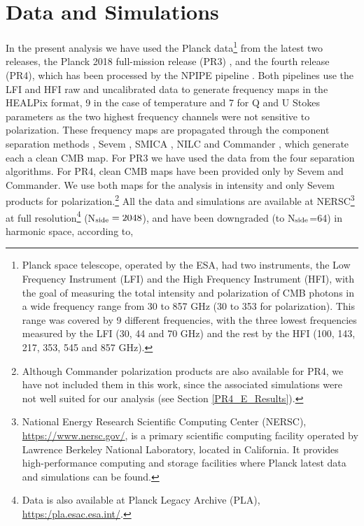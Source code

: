 \section{Data and Simulations}\label{DatSim}

In the present analysis we have used the Planck data\footnote{Planck space telescope, operated by the ESA, had two instruments, the Low Frequency Instrument (LFI) and the High Frequency Instrument (HFI), with the goal of measuring the total intensity and polarization of CMB photons in a wide frequency range from 30 to 857 GHz (30 to 353 for polarization). This range was 
covered by 9 different frequencies, with the three lowest frequencies measured by the LFI (30, 44 and 70 GHz) and the rest by the HFI (100, 143, 217, 353, 545 and 857 GHz).} from the latest two releases, the Planck 2018 full-mission release (PR3) \cite{Planck:2018nkj}, and the fourth release (PR4), which has been processed by the NPIPE pipeline \cite{Planck:2020olo}. Both pipelines use the LFI and HFI raw and uncalibrated data
to generate frequency maps in the HEALPix \cite{Gorski:2004by} format, 9 in the case of temperature and 7 for Q and U Stokes parameters as the two highest frequency channels were not sensitive to polarization. These frequency maps are propagated through the component separation methods \cite{Planck:2018yye}, Sevem \cite{2012MNRAS.420.2162F}, SMICA \cite{2008arXiv0803.1814C}, NILC \cite{10.1111/j.1365-2966.2011.19770.x} and Commander \cite{2008ApJ...676...10E}, which generate each a clean CMB map. For PR3 we have used the data from the four separation algorithms. For PR4, clean CMB maps have been provided only by Sevem and Commander. We use both maps for the analysis in intensity and only Sevem products for polarization.\footnote{Although Commander polarization products are also available for PR4, 
we have not included them in this work, since the associated simulations were not well suited for our analysis (see Section \ref{PR4_E_Results}).} All the data and simulations are available at NERSC\footnote{National Energy Research Scientific Computing Center (NERSC), \url{https://www.nersc.gov/}, is a primary scientific computing facility operated by Lawrence Berkeley National Laboratory, located in California. It provides high-performance computing and storage facilities where Planck latest data and simulations can be found.} at full resolution\footnote{Data is also available at Planck Legacy Archive (PLA), \url{https:/pla.esac.esa.int/}.}  (N$_{\rm side} = 2048$), and have been downgraded (to N$_{\rm side}$=64) in harmonic space, according to, 

